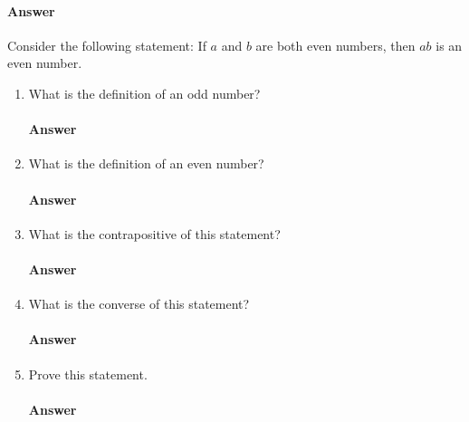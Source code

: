 \documentclass{article}
\begin{document}
\paragraph{Answer}

\todo{}

\collab{\todo{}}
Consider the following statement: If $a$ and $b$ are both even numbers, then $ab$ is
an even number.
\begin{enumerate}
    \item What is the definition of an odd number?

        \paragraph{Answer}

    \item What is the definition of an even number?

        \paragraph{Answer}
        \todo{}

    \item What is the contrapositive of this statement?

        \paragraph{Answer}
        \todo{}

    \item What is the converse of this statement?

        \paragraph{Answer}
        \todo{}

    \item Prove this statement.

        \paragraph{Answer}
        \todo{}

\end{enumerate}
\end{document}
